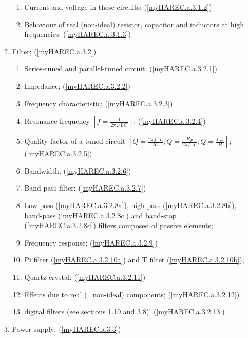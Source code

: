 \begin{enumerate}
\begin{enumerate}[noitemsep]
\begin{enumerate}[noitemsep]
\item Current and voltage in these circuits; (\ref{myHAREC.a.3.1.2})\label{HAREC.a.3.1.2}
\item Behaviour of real (non-ideal) resistor, capacitor and inductors at high frequencies. (\ref{myHAREC.a.3.1.3})\label{HAREC.a.3.1.3}
\end{enumerate}
\item Filter; (\ref{myHAREC.a.3.2})\label{HAREC.a.3.2}
\begin{enumerate}[noitemsep]
\item Series-tuned and parallel-tuned circuit: (\ref{myHAREC.a.3.2.1})\label{HAREC.a.3.2.1}
\item Impedance; (\ref{myHAREC.a.3.2.2})\label{HAREC.a.3.2.2}
\item Frequency characteristic;  (\ref{myHAREC.a.3.2.3})\label{HAREC.a.3.2.3}
\item Resonance frequency \(\left[f=\frac{1}{2\pi\sqrt{LC}}\right]\); (\ref{myHAREC.a.3.2.4})\label{HAREC.a.3.2.4}
\item Quality factor of a tuned circuit \(\left[Q=\frac{2\pi f \cdot L}{R_S}; Q=\frac{R_P}{2\pi f \cdot L};Q=\frac{f_{res}}{B}\right]\); (\ref{myHAREC.a.3.2.5})\label{HAREC.a.3.2.5}
\item Bandwidth; (\ref{myHAREC.a.3.2.6})\label{HAREC.a.3.2.6}
\item Band-pass filter; (\ref{myHAREC.a.3.2.7})\label{HAREC.a.3.2.7}
\item Low-pass (\ref{myHAREC.a.3.2.8a})\label{HAREC.a.3.2.8a}, high-pass (\ref{myHAREC.a.3.2.8b})\label{HAREC.a.3.2.8b}, band-pass (\ref{myHAREC.a.3.2.8c})\label{HAREC.a.3.2.8c} and band-stop (\ref{myHAREC.a.3.2.8d})\label{HAREC.a.3.2.8d} filters composed of passive elements;
\item Frequency response; (\ref{myHAREC.a.3.2.9})\label{HAREC.a.3.2.9}
\item Pi filter (\ref{myHAREC.a.3.2.10a})\label{HAREC.a.3.2.10a} and T filter (\ref{myHAREC.a.3.2.10b})\label{HAREC.a.3.2.10b};
\item Quartz crystal; (\ref{myHAREC.a.3.2.11})\label{HAREC.a.3.2.11}
\item Effects due to real (=non-ideal) components; (\ref{myHAREC.a.3.2.12})\label{HAREC.a.3.2.12}
\item digital filters (see sections 1.10 and 3.8). (\ref{myHAREC.a.3.2.13})\label{HAREC.a.3.2.13}
\end{enumerate}
\item Power supply; (\ref{myHAREC.a.3.3})\label{HAREC.a.3.3}

\end{enumerate}
\end{enumerate}
